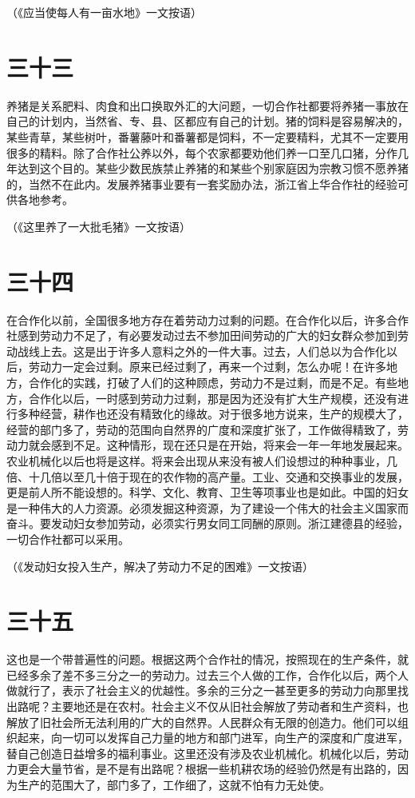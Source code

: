 （《应当使每人有一亩水地》一文按语）

\section*{三十三}

养猪是关系肥料、肉食和出口换取外汇的大问题，一切合作社都要将养猪一事放在自己的计划内，当然省、专、县、区都应有自己的计划。猪的饲料是容易解决的，某些青草，某些树叶，番薯藤叶和番薯都是饲料，不一定要精料，尤其不一定要用很多的精料。除了合作社公养以外，每个农家都要劝他们养一口至几口猪，分作几年达到这个目的。某些少数民族禁止养猪的和某些个别家庭因为宗教习惯不愿养猪的，当然不在此内。发展养猪事业要有一套奖励办法，浙江省上华合作社的经验可供各地参考。


（《这里养了一大批毛猪》一文按语）

\section*{三十四}

在合作化以前，全国很多地方存在着劳动力过剩的问题。在合作化以后，许多合作社感到劳动力不足了，有必要发动过去不参加田间劳动的广大的妇女群众参加到劳动战线上去。这是出于许多人意料之外的一件大事。过去，人们总以为合作化以后，劳动力一定会过剩。原来已经过剩了，再来一个过剩，怎么办呢！在许多地方，合作化的实践，打破了人们的这种顾虑，劳动力不是过剩，而是不足。有些地方，合作化以后，一时感到劳动力过剩，那是因为还没有扩大生产规模，还没有进行多种经营，耕作也还没有精致化的缘故。对于很多地方说来，生产的规模大了，经营的部门多了，劳动的范围向自然界的广度和深度扩张了，工作做得精致了，劳动力就会感到不足。这种情形，现在还只是在开始，将来会一年一年地发展起来。农业机械化以后也将是这样。将来会出现从来没有被人们设想过的种种事业，几倍、十几倍以至几十倍于现在的农作物的高产量。工业、交通和交换事业的发展，更是前人所不能设想的。科学、文化、教育、卫生等项事业也是如此。中国的妇女是一种伟大的人力资源。必须发掘这种资源，为了建设一个伟大的社会主义国家而奋斗。要发动妇女参加劳动，必须实行男女同工同酬的原则。浙江建德县的经验，一切合作社都可以采用。


（《发动妇女投入生产，解决了劳动力不足的困难》一文按语）

\section*{三十五}

这也是一个带普遍性的问题。根据这两个合作社的情况，按照现在的生产条件，就已经多余了差不多三分之一的劳动力。过去三个人做的工作，合作化以后，两个人做就行了，表示了社会主义的优越性。多余的三分之一甚至更多的劳动力向那里找出路呢？主要地还是在农村。社会主义不仅从旧社会解放了劳动者和生产资料，也解放了旧社会所无法利用的广大的自然界。人民群众有无限的创造力。他们可以组织起来，向一切可以发挥自己力量的地方和部门进军，向生产的深度和广度进军，替自己创造日益增多的福利事业。这里还没有涉及农业机械化。机械化以后，劳动力更会大量节省，是不是有出路呢？根据一些机耕农场的经验仍然是有出路的，因为生产的范围大了，部门多了，工作细了，这就不怕有力无处使。


